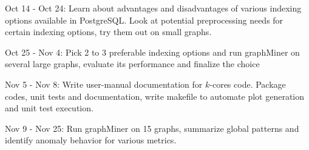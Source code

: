 \begin{itemize*}
\item{Oct 14 - Oct 24}: Learn about advantages and disadvantages of various indexing options available in PostgreSQL. Look at potential preprocessing needs for certain indexing options, try them out on small graphs.
\item{Oct 25 - Nov 4}: Pick 2 to 3 preferable indexing options and run graphMiner on several large graphs, evaluate its performance and finalize the choice
\item{Nov 5 - Nov 8}: Write user-manual documentation for $k$-cores code. Package codes, unit tests and documentation, write makefile to automate plot generation and unit test execution.
\item{Nov 9 - Nov 25}: Run graphMiner on 15 graphs, summarize global patterns and identify anomaly behavior for various metrics.
\end{itemize*}

